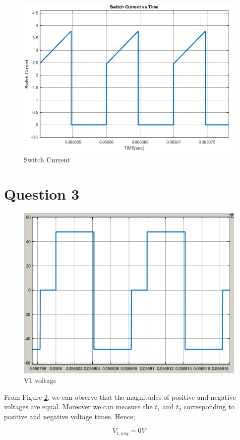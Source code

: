 \documentclass[oneside,12pt]{article}
\begin{document}
\begin{figure}[H]
	\centering
	\includegraphics[scale=0.8]{"../q2/switch current"}
	\caption{Switch Current}
	\label{fig:switch-current}
\end{figure}


\section{Question 3}

\begin{figure}[H]
	\centering
	\includegraphics[width=0.7\linewidth]{../q3/v1_graph}
	\caption{V1 voltage}
	\label{fig:v1graph}
\end{figure}
 From Figure \ref{fig:v1graph}, we can observe that the magnitudes of positive and negative voltages are equal. Moreover we can measure the $ t_{1} $ and $ t_{2}$ corresponding to positive and negative voltage times. Hence;
 
 	\begin{equation}
 		V_{1,avg}= 0 V
 	\end{equation}
 	
\end{document}
